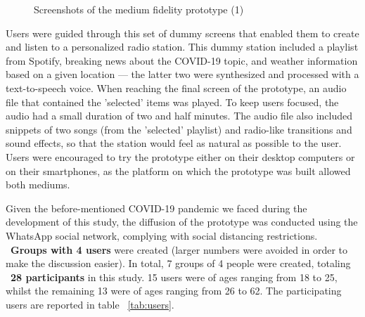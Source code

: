 {{\begin{figure}[htbp]
		 \qquad
	\caption{Screenshots of the medium fidelity prototype (1)}
	\label{fig:digitalstoryboard}
\end{figure}

Users were guided through this set of dummy screens that enabled them to create and listen to a personalized radio station. This dummy station included a playlist from Spotify, breaking news about the COVID-19 topic, and weather information based on a given location — the latter two were synthesized and processed with a text-to-speech voice. When reaching the final screen of the prototype, an audio file that contained the 'selected' items was played. To keep users focused, the audio had a small duration of two and half minutes. The audio file also included snippets of two songs (from the 'selected' playlist) and radio-like transitions and sound effects, so that the station would feel as natural as possible to the user. Users were encouraged to try the prototype either on their desktop computers or on their smartphones, as the platform on which the prototype was built allowed both mediums.

Given the before-mentioned COVID-19 pandemic we faced during the development of this study, the diffusion of the prototype was conducted using the WhatsApp social network, complying with social distancing restrictions.  ~\textbf{Groups with 4 users} were created (larger numbers were avoided in order to make the discussion easier). In total, 7 groups of 4 people were created, totaling ~\textbf{28 participants} in this study. 15 users were of ages ranging from 18 to 25, whilst the remaining 13 were of ages ranging from 26 to 62. The participating users are reported in table ~\ref{tab:users}.

}}
